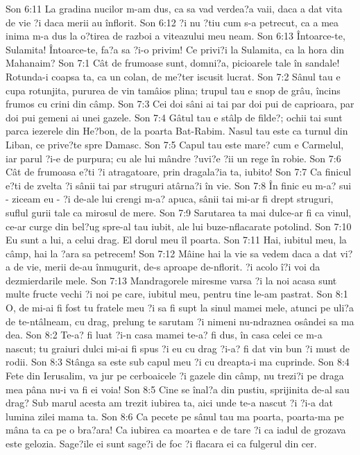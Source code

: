 Son 6:11  La gradina nucilor m-am dus, ca sa vad verdea?a vaii, daca a dat vita de vie ?i daca merii au înflorit.
Son 6:12  ?i nu ?tiu cum s-a petrecut, ca a mea inima m-a dus la o?tirea de razboi a viteazului meu neam.
Son 6:13  Întoarce-te, Sulamita! Întoarce-te, fa?a sa ?i-o privim! Ce privi?i la Sulamita, ca la hora din Mahanaim?
Son 7:1  Cât de frumoase sunt, domni?a, picioarele tale în sandale! Rotunda-i coapsa ta, ca un colan, de me?ter iscusit lucrat.
Son 7:2  Sânul tau e cupa rotunjita, pururea de vin tamâios plina; trupul tau e snop de grâu, încins frumos cu crini din câmp.
Son 7:3  Cei doi sâni ai tai par doi pui de caprioara, par doi pui gemeni ai unei gazele.
Son 7:4  Gâtul tau e stâlp de filde?; ochii tai sunt parca iezerele din He?bon, de la poarta Bat-Rabim. Nasul tau este ca turnul din Liban, ce prive?te spre Damasc.
Son 7:5  Capul tau este mare? cum e Carmelul, iar parul ?i-e de purpura; cu ale lui mândre ?uvi?e ?ii un rege în robie.
Son 7:6  Cât de frumoasa e?ti ?i atragatoare, prin dragala?ia ta, iubito!
Son 7:7  Ca finicul e?ti de zvelta ?i sânii tai par struguri atârna?i în vie.
Son 7:8  În finic eu m-a? sui - ziceam eu - ?i de-ale lui crengi m-a? apuca, sânii tai mi-ar fi drept struguri, suflul gurii tale ca mirosul de mere.
Son 7:9  Sarutarea ta mai dulce-ar fi ca vinul, ce-ar curge din bel?ug spre-al tau iubit, ale lui buze-nflacarate potolind.
Son 7:10  Eu sunt a lui, a celui drag. El dorul meu îl poarta.
Son 7:11  Hai, iubitul meu, la câmp, hai la ?ara sa petrecem!
Son 7:12  Mâine hai la vie sa vedem daca a dat vi?a de vie, merii de-au înmugurit, de-s aproape de-nflorit. ?i acolo î?i voi da dezmierdarile mele.
Son 7:13  Mandragorele miresme varsa ?i la noi acasa sunt multe fructe vechi ?i noi pe care, iubitul meu, pentru tine le-am pastrat.
Son 8:1  O, de mi-ai fi fost tu fratele meu ?i sa fi supt la sinul mamei mele, atunci pe uli?a de te-ntâlneam, cu drag, prelung te sarutam ?i nimeni nu-ndraznea osândei sa ma dea.
Son 8:2  Te-a? fi luat ?i-n casa mamei te-a? fi dus, în casa celei ce m-a nascut; tu graiuri dulci mi-ai fi spus ?i eu cu drag ?i-a? fi dat vin bun ?i must de rodii.
Son 8:3  Stânga sa este sub capul meu ?i cu dreapta-i ma cuprinde.
Son 8:4  Fete din Ierusalim, va jur pe cerboaicele ?i gazele din câmp, nu trezi?i pe draga mea pâna nu-i va fi ei voia!
Son 8:5  Cine se înal?a din pustiu, sprijinita de-al sau drag? Sub marul acesta am trezit iubirea ta, aici unde te-a nascut ?i ?i-a dat lumina zilei mama ta.
Son 8:6  Ca pecete pe sânul tau ma poarta, poarta-ma pe mâna ta ca pe o bra?ara! Ca iubirea ca moartea e de tare ?i ca iadul de grozava este gelozia. Sage?ile ei sunt sage?i de foc ?i flacara ei ca fulgerul din cer.

